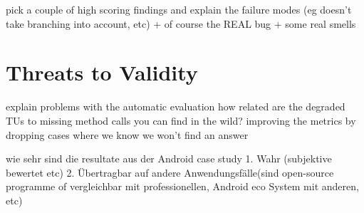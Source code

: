 pick a couple of high scoring findings and explain the failure modes (eg doesn't take branching into account, etc)
+ of course the REAL bug + some real smells

\section{Threats to Validity}

explain problems with the automatic evaluation
how related are the degraded TUs to missing method calls you can find in the wild?
improving the metrics by dropping cases where we know we won't find an answer

wie sehr sind die resultate aus der Android case study 1. Wahr (subjektive bewertet etc) 2. Übertragbar auf andere Anwendungsfälle(sind open-source programme of vergleichbar mit professionellen, Android eco System mit anderen, etc)
